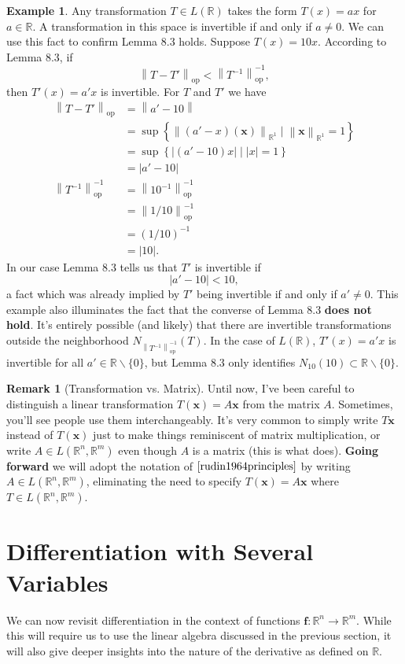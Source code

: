 \documentclass{article}
\newcommand{\R}{\mathbb{R}}
\newcommand{\x}{\mathbf{x}}
\newcommand{\f}{\mathbf{f}}
\newcommand{\norm}[1]{\left\lVert#1\right\rVert}
\newcommand{\normop}[1]{\left\lVert#1\right\rVert_\text{op}}
\theoremstyle{definition}
\newtheorem{example}{Example}[section]
\newtheorem{remark}{Remark}[section]
\begin{document}
\begin{example}
	Any transformation $ T\in L(\R) $ takes the form $ T(x)=ax $ for $ a\in \R $. A transformation in this space is invertible if and only if $ a\neq 0 $. We can use this fact to confirm Lemma 8.3 holds. Suppose $ T(x)= 10x $. According to Lemma 8.3, if $$\normop{T-T'}<\normop{T^{-1}}^{-1}   ,$$ then $ T'(x)=a'x $ is invertible. For $ T $ and $ T' $ we have 
	\begin{align*}
		\normop{T-T'} & = \norm{a' - 10}\\ & =  \sup\left\{\norm{(a'-x)(\x)}_{\R^1}\mid \norm{\x}_{\R^1} = 1\right\} \\
		& =  \sup\left\{|(a'-10)x|\mid |x|=1\right\}\\ & = |a'-10|\\
		\normop{T^{-1}}^{-1} & = \normop{10^{-1}}^{-1} \\
		& = \normop{1/10}^{-1} \\
		& = (1/10)^{-1}\\
		& = |10|. 
	\end{align*}
In our case Lemma 8.3 tells us that $ T' $ is invertible if $$ |a' - 10| < 10,$$ a fact which was already implied by $ T' $ being invertible if and only if $ a'\neq 0 $. This example also illuminates the fact that the converse of Lemma 8.3 \textbf{does not hold}. It's entirely possible (and likely) that there are invertible transformations outside the neighborhood $N_{\normop{T^{-1}}^{-1}}(T) $. In the case of $ L(\R) $, $ T'(x)=a'x $ is invertible for all $ a'\in \R\backslash\{0\} $, but Lemma 8.3 only identifies $ N_{10}(10)\subset\R\backslash\{0\}  $.  
\end{example}
\begin{remark}[Transformation vs. Matrix]
	Until now, I've been careful to distinguish a linear transformation $ T(\x)=A\x $ from the matrix $ A $. Sometimes, you'll see people use them interchangeably. It's very common to simply write $ T\x $ instead of $ T(\x) $ just to make things reminiscent of matrix multiplication, or write $ A\in L(\R^n, \R^m) $ even though $ A $ is a matrix (this is what \cite{rudin1964principles} does). \textbf{Going forward} we will adopt the notation of $ \cite{rudin1964principles} $ by writing $ A\in L(\R^n,\R^m) $, eliminating the need to specify $ T(\x)=A\x $ where $ T\in L(\R^n,\R^m) $. 
\end{remark}
\section{Differentiation with Several Variables}
We can now revisit differentiation in the context of functions $ \f:\R^n\to\R^m $. While this will require us to use the linear algebra discussed in the previous section, it will also give deeper insights into the nature of the derivative as defined on $ \R $. 
\end{document}
